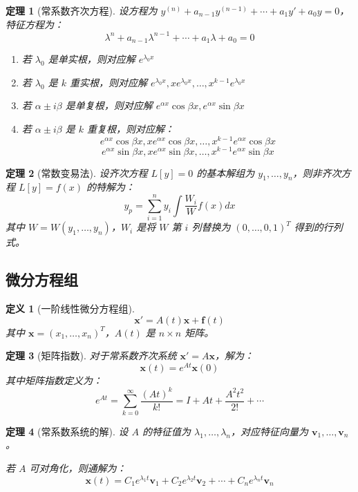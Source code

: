 \documentclass[12pt]{article}
\newtheorem{theorem}{定理}[section]
\newtheorem{definition}{定义}[section]
\begin{document}
\begin{theorem}[常系数齐次方程]
设方程为 $y^{(n)} + a_{n-1}y^{(n-1)} + \cdots + a_1y' + a_0y = 0$，特征方程为：
$$\lambda^n + a_{n-1}\lambda^{n-1} + \cdots + a_1\lambda + a_0 = 0$$

\begin{enumerate}
\item 若 $\lambda_0$ 是单实根，则对应解 $e^{\lambda_0 x}$
\item 若 $\lambda_0$ 是 $k$ 重实根，则对应解 $e^{\lambda_0 x}, xe^{\lambda_0 x}, \ldots, x^{k-1}e^{\lambda_0 x}$
\item 若 $\alpha \pm i\beta$ 是单复根，则对应解 $e^{\alpha x}\cos\beta x, e^{\alpha x}\sin\beta x$
\item 若 $\alpha \pm i\beta$ 是 $k$ 重复根，则对应解：
$$e^{\alpha x}\cos\beta x, xe^{\alpha x}\cos\beta x, \ldots, x^{k-1}e^{\alpha x}\cos\beta x$$
$$e^{\alpha x}\sin\beta x, xe^{\alpha x}\sin\beta x, \ldots, x^{k-1}e^{\alpha x}\sin\beta x$$
\end{enumerate}
\end{theorem}

\begin{theorem}[常数变易法]
设齐次方程 $L[y] = 0$ 的基本解组为 $y_1, \ldots, y_n$，则非齐次方程 $L[y] = f(x)$ 的特解为：
$$y_p = \sum_{i=1}^{n} y_i \int \frac{W_i}{W} f(x) dx$$
其中 $W = W(y_1, \ldots, y_n)$，$W_i$ 是将 $W$ 第 $i$ 列替换为 $(0, \ldots, 0, 1)^T$ 得到的行列式。
\end{theorem}

\subsection{微分方程组}

\begin{definition}[一阶线性微分方程组]
$$\mathbf{x}' = A(t)\mathbf{x} + \mathbf{f}(t)$$
其中 $\mathbf{x} = (x_1, \ldots, x_n)^T$，$A(t)$ 是 $n \times n$ 矩阵。
\end{definition}

\begin{theorem}[矩阵指数]
对于常系数齐次系统 $\mathbf{x}' = A\mathbf{x}$，解为：
$$\mathbf{x}(t) = e^{At}\mathbf{x}(0)$$
其中矩阵指数定义为：
$$e^{At} = \sum_{k=0}^{\infty} \frac{(At)^k}{k!} = I + At + \frac{A^2t^2}{2!} + \cdots$$
\end{theorem}

\begin{theorem}[常系数系统的解]
设 $A$ 的特征值为 $\lambda_1, \ldots, \lambda_n$，对应特征向量为 $\mathbf{v}_1, \ldots, \mathbf{v}_n$。

若 $A$ 可对角化，则通解为：
$$\mathbf{x}(t) = C_1 e^{\lambda_1 t}\mathbf{v}_1 + C_2 e^{\lambda_2 t}\mathbf{v}_2 + \cdots + C_n e^{\lambda_n t}\mathbf{v}_n$$
\end{theorem}
\end{document}

